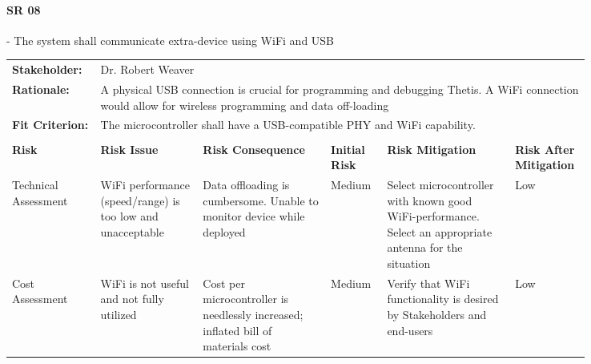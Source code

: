\begin{landscape}


\paragraph*{SR 08} - The system shall communicate extra-device using WiFi and USB 

{\fontsize{8pt}{8pt}\selectfont
\begin{longtable}{| p{0.12\linewidth} | p{0.16\linewidth} |  p{0.20\linewidth} | p{0.08\linewidth} | p{0.20\linewidth} | p{0.08\linewidth} |}
	\hline \endlastfoot
	
	\hline
	\rowcolor[gray]{0.8}
	\multicolumn{6}{|c|}{ } \\
	\hline
	\textbf{Stakeholder:} & \multicolumn{5}{|l|}{Dr. Robert Weaver} \\
	\hline
	\textbf{Rationale:} & \multicolumn{5}{|p{0.8\linewidth}|}{A physical USB connection is crucial for programming and debugging Thetis. A WiFi connection would allow for wireless programming and data off-loading} \\
	\hline
	\textbf{Fit Criterion:} & \multicolumn{5}{|p{0.8\linewidth}|}{The microcontroller shall have a USB-compatible PHY and WiFi capability.} \\
	\hline
	\rowcolor[gray]{0.8}
	\multicolumn{6}{|c|}{ } \\
	\hline
	\textbf{Risk} & \textbf{Risk Issue} & \textbf{Risk Consequence} & \textbf{Initial Risk} & \textbf{Risk Mitigation} & \textbf{Risk \newline After \newline Mitigation} \\
	\hline
	Technical \newline Assessment & WiFi performance (speed/range) is too low and unacceptable & Data offloading is cumbersome. \newline Unable to monitor device while deployed & \cellcolor{yellow} Medium & Select microcontroller with known good WiFi-performance. \newline Select an appropriate antenna for the situation & \cellcolor{green} Low \\
	\hline
	Cost \newline Assessment & WiFi is not useful and not fully utilized & Cost per microcontroller is needlessly increased; inflated bill of materials cost & \cellcolor{yellow} Medium & Verify that WiFi functionality is desired by Stakeholders and end-users & \cellcolor{green} Low \\

\end{longtable}}
\end{landscape}
